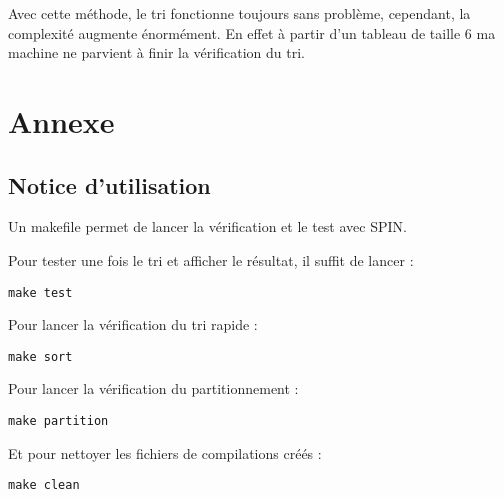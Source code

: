 \documentclass[french]{article}
\begin{document}
Avec cette méthode, le tri fonctionne toujours sans problème, cependant, la complexité augmente
énormément. En effet à partir d'un tableau de taille 6 ma machine ne parvient à finir la 
vérification du tri.

\begin{figure}[!h]
    \centering
\end{figure}

\newpage

\section{Annexe}
\subsection{Notice d'utilisation}
\label{annexe:notice}
Un makefile permet de lancer la vérification et le test avec SPIN.\newline

Pour tester une fois le tri et afficher le résultat, il suffit de lancer :
\begin{verbatim}
make test
\end{verbatim}

Pour lancer la vérification du tri rapide :
\begin{verbatim}
make sort
\end{verbatim}

Pour lancer la vérification du partitionnement :
\begin{verbatim}
make partition
\end{verbatim}

Et pour nettoyer les fichiers de compilations créés :
\begin{verbatim}
make clean
\end{verbatim}
\end{document}
